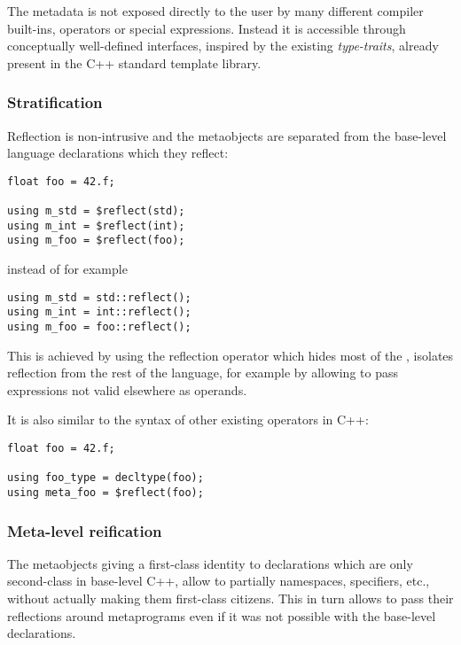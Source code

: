 The metadata is not exposed directly to the user by many different compiler
built-ins, operators or special expressions.
Instead it is accessible through conceptually well-defined interfaces,
inspired by the existing {\em type-traits}, already present in
the C++ standard template library.

\subsubsection{Stratification}
\label{design-stratification}

Reflection is non-intrusive and the metaobjects are separated
from the base-level language declarations which they reflect:

\begin{verbatim}
float foo = 42.f;

using m_std = $reflect(std);
using m_int = $reflect(int);
using m_foo = $reflect(foo);
\end{verbatim}

instead of for example

\begin{verbatim}
using m_std = std::reflect();
using m_int = int::reflect();
using m_foo = foo::reflect();
\end{verbatim}

This is achieved by using the reflection operator which hides most of the
, isolates reflection from the rest of the language,
for example by allowing to pass expressions not valid elsewhere as operands.

It is also similar to the syntax of other existing operators in C++:

\begin{verbatim}
float foo = 42.f;

using foo_type = decltype(foo);
using meta_foo = $reflect(foo);
\end{verbatim}

\subsubsection{Meta-level reification}
\label{design-reification}

The metaobjects giving a first-class identity to declarations
which are only second-class in base-level C++,
allow to partially  namespaces, specifiers, etc., without actually
making them first-class citizens. This in turn allows to pass their reflections around
metaprograms even if it was not possible with the base-level declarations.

